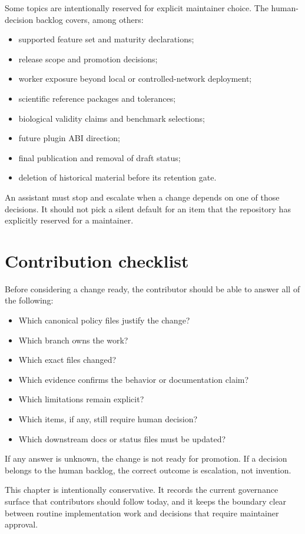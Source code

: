 Some topics are intentionally reserved for explicit maintainer choice. The
human-decision backlog covers, among others:
\begin{itemize}
\item supported feature set and maturity declarations;
\item release scope and promotion decisions;
\item worker exposure beyond local or controlled-network deployment;
\item scientific reference packages and tolerances;
\item biological validity claims and benchmark selections;
\item future plugin ABI direction;
\item final publication and removal of draft status;
\item deletion of historical material before its retention gate.
\end{itemize}

An assistant must stop and escalate when a change depends on one of those
decisions. It should not pick a silent default for an item that the repository
has explicitly reserved for a maintainer.

\section{Contribution checklist}
\label{sec:governance-contribution-checklist}

Before considering a change ready, the contributor should be able to answer
all of the following:
\begin{itemize}
\item Which canonical policy files justify the change?
\item Which branch owns the work?
\item Which exact files changed?
\item Which evidence confirms the behavior or documentation claim?
\item Which limitations remain explicit?
\item Which items, if any, still require human decision?
\item Which downstream docs or status files must be updated?
\end{itemize}

If any answer is unknown, the change is not ready for promotion. If a decision
belongs to the human backlog, the correct outcome is escalation, not invention.

This chapter is intentionally conservative. It records the current governance
surface that contributors should follow today, and it keeps the boundary clear
between routine implementation work and decisions that require maintainer
approval.

